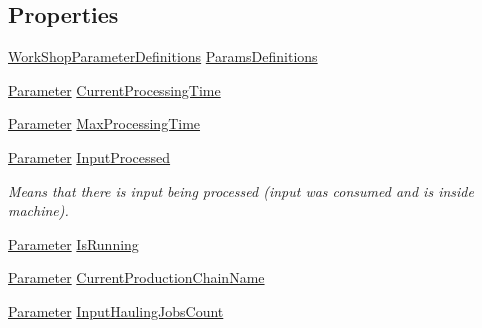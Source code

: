 \subsection*{Properties}
\begin{DoxyCompactItemize}
\item 
\hyperlink{class_project_porcupine_1_1_buildable_1_1_components_1_1_workshop_1_1_work_shop_parameter_definitions}{Work\+Shop\+Parameter\+Definitions} \hyperlink{class_project_porcupine_1_1_buildable_1_1_components_1_1_workshop_a3a420273ac915717c9dbdf975c621d5e}{Params\+Definitions}
\item 
\hyperlink{class_parameter}{Parameter} \hyperlink{class_project_porcupine_1_1_buildable_1_1_components_1_1_workshop_a0ac1d67e2b391dc81eee125eab48b3f2}{Current\+Processing\+Time}
\item 
\hyperlink{class_parameter}{Parameter} \hyperlink{class_project_porcupine_1_1_buildable_1_1_components_1_1_workshop_a73736780857311a757ea45af0dcf7f75}{Max\+Processing\+Time}
\item 
\hyperlink{class_parameter}{Parameter} \hyperlink{class_project_porcupine_1_1_buildable_1_1_components_1_1_workshop_a6f9b42749fd16a75d114d47844529e11}{Input\+Processed}
\begin{DoxyCompactList}\small\item\em Means that there is input being processed (input was consumed and is inside machine). \end{DoxyCompactList}\item 
\hyperlink{class_parameter}{Parameter} \hyperlink{class_project_porcupine_1_1_buildable_1_1_components_1_1_workshop_a1806c2ccfeccfd62fb85a04ae30e1c5c}{Is\+Running}
\item 
\hyperlink{class_parameter}{Parameter} \hyperlink{class_project_porcupine_1_1_buildable_1_1_components_1_1_workshop_ac0c82b5568b9c660dd9dfd0a7bd0bf58}{Current\+Production\+Chain\+Name}
\item 
\hyperlink{class_parameter}{Parameter} \hyperlink{class_project_porcupine_1_1_buildable_1_1_components_1_1_workshop_abe2dba7935a354973c78034a025da092}{Input\+Hauling\+Jobs\+Count}

\end{DoxyCompactItemize}
